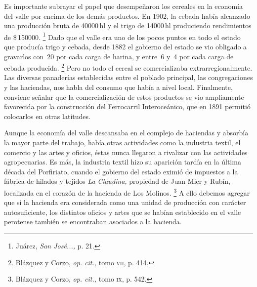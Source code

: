 \documentclass[14pt,twoside,final]{extbook} %
\let\oldfootnote\footnote
\renewcommand\footnote[1]{%
\oldfootnote{\hspace{1mm}#1}}
\begin{document}
Es importante subrayar el papel que desempeñaron los cereales en la economía del valle por encima de los demás productos. En 1902, la cebada había alcanzado una producción bruta de 40000\,hl y el trigo de 14000\,hl produciendo rendimientos de \$\,150000.\footnote{Juárez, \emph{San José...,} p. 21.} Dado que el valle era uno de los pocos puntos en todo el estado que producía trigo y cebada, desde 1882 el gobierno del estado se vio obligado a gravarlos con \textcent{}\,20 por cada carga de harina, y entre \textcent{}\,6 y \textcent{}\,4 por cada carga de cebada producida.\footnote{Blázquez y Corzo, \emph{op. cit.,} tomo \textsc{vii}, p. 414.} Pero no todo el cereal se comercializaba extrarregionalmente. Las diversas panaderías establecidas entre el poblado principal, las congregaciones y las haciendas, nos habla del consumo que había a nivel local. Finalmente, conviene señalar que la comercialización de estos productos se vio ampliamente favorecida por la construcción del Ferrocarril Interoceánico, que en 1891 permitió colocarlos en otras latitudes.

Aunque la economía del valle descansaba en el complejo de haciendas y absorbía la mayor parte del trabajo, había otras actividades como la industria textil, el comercio y las artes y oficios, éstas nunca llegaron a rivalizar con las actividades agropecuarias. Es más, la industria textil hizo su aparición tardía en la última década del Porfiriato, cuando el gobierno del estado eximió de impuestos a la fábrica de hilados y tejidos \emph{La Claudina,} propiedad de Juan Mier y Rubín, localizada en el corazón de la hacienda de Los Molinos.\footnote{Blázquez y Corzo, \emph{op. cit.,} tomo \textsc{ix}, p. 542.} A ello debemos agregar que si la hacienda era considerada como una unidad de producción con carácter autosuficiente, los distintos oficios y artes que se habían establecido en el valle perotense también se encontraban asociados a la hacienda.
\end{document}
